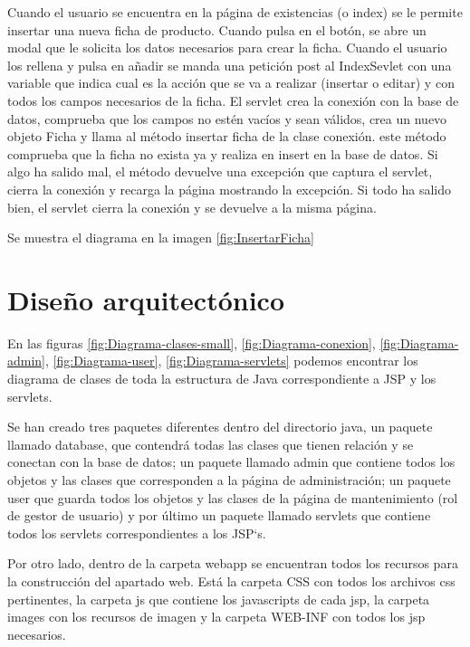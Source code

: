 Cuando el usuario se encuentra en la página de existencias (o index) se le permite insertar una nueva ficha de producto. Cuando pulsa en el botón, se abre un modal que le solicita los datos necesarios para crear la ficha. Cuando el usuario los rellena y pulsa en añadir se manda una petición post al IndexSevlet con una variable que indica cual es la acción que se va a realizar (insertar o editar) y con todos los campos necesarios de la ficha. El servlet crea la conexión con la base de datos, comprueba que los campos no estén vacíos y sean válidos, crea un nuevo objeto Ficha y llama al método insertar ficha de la clase conexión. este método comprueba que la ficha no exista ya y realiza en insert en la base de datos. Si algo ha salido mal, el método devuelve una excepción que captura el servlet, cierra la conexión y recarga la página mostrando la excepción. Si todo ha salido bien, el servlet  cierra la conexión y se devuelve a la misma página.

Se muestra el diagrama en la imagen \ref{fig:InsertarFicha}


 
\section{Diseño arquitectónico}

En las figuras \ref{fig:Diagrama-clases-small}, \ref{fig:Diagrama-conexion}, \ref{fig:Diagrama-admin}, \ref{fig:Diagrama-user}, \ref{fig:Diagrama-servlets} podemos encontrar los diagrama de clases de toda la estructura de Java correspondiente a JSP y los servlets.

Se han creado tres paquetes diferentes dentro del directorio java, un paquete llamado database, que contendrá todas las clases que tienen relación y se conectan con la base de datos; un paquete llamado admin que contiene todos los objetos y las clases que corresponden a la página de administración; un paquete user que guarda todos los objetos y las clases de la página de mantenimiento (rol de gestor de usuario) y por último un paquete llamado servlets que contiene todos los servlets correspondientes a los JSP`s.







Por otro lado, dentro de la carpeta webapp se encuentran todos los recursos para la construcción del apartado web. Está la carpeta CSS con todos los archivos css pertinentes, la carpeta js que contiene los javascripts de cada jsp, la carpeta images con los recursos de imagen y la carpeta WEB-INF con todos los jsp necesarios.




